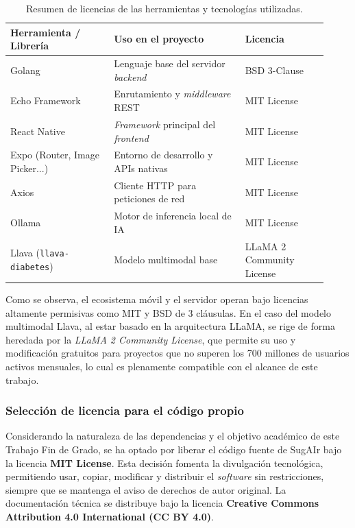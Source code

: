 \begin{table}[h]
\centering
\begin{tabular}{ p{0.30\linewidth} p{0.38\linewidth} p{0.24\linewidth} }
\hline
\textbf{Herramienta / Librería} & \textbf{Uso en el proyecto} & \textbf{Licencia} \\ \hline
Golang & Lenguaje base del servidor \textit{backend} & BSD 3-Clause \\
Echo Framework & Enrutamiento y \textit{middleware} REST & MIT License \\
React Native & \textit{Framework} principal del \textit{frontend} & MIT License \\
Expo (Router, Image Picker...) & Entorno de desarrollo y APIs nativas & MIT License \\
Axios & Cliente HTTP para peticiones de red & MIT License \\
Ollama & Motor de inferencia local de IA & MIT License \\
Llava (\texttt{llava-diabetes}) & Modelo multimodal base & LLaMA 2 Community License \\ \hline
\end{tabular}
\caption{Resumen de licencias de las herramientas y tecnologías utilizadas.}
\label{tab:licencias}
\end{table}

Como se observa, el ecosistema móvil y el servidor operan bajo licencias altamente permisivas como MIT y BSD de 3 cláusulas. En el caso del modelo multimodal Llava, al estar basado en la arquitectura LLaMA, se rige de forma heredada por la \textit{LLaMA 2 Community License}, que permite su uso y modificación gratuitos para proyectos que no superen los 700 millones de usuarios activos mensuales, lo cual es plenamente compatible con el alcance de este trabajo.

\subsubsection*{Selección de licencia para el código propio}
Considerando la naturaleza de las dependencias y el objetivo académico de este Trabajo Fin de Grado, se ha optado por liberar el código fuente de SugAIr bajo la licencia \textbf{MIT License}. Esta decisión fomenta la divulgación tecnológica, permitiendo usar, copiar, modificar y distribuir el \textit{software} sin restricciones, siempre que se mantenga el aviso de derechos de autor original. La documentación técnica se distribuye bajo la licencia \textbf{Creative Commons Attribution 4.0 International (CC BY 4.0)}.

